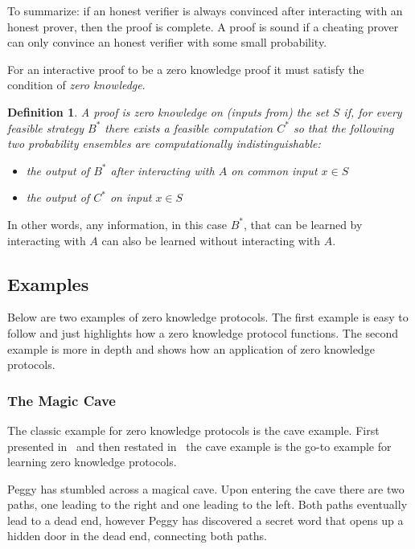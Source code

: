 \documentclass{sig-alternate}
\newtheorem{zeroKnowledge}{Definition}
\begin{document}
		To summarize: if an honest verifier is always convinced after interacting with
		an honest prover, then the proof is complete. A proof is sound if a cheating
		prover can only convince an honest verifier with some small probability.
		
		For an interactive proof to be a zero knowledge proof it must
		satisfy the condition of \textit{zero knowledge}.		
		
		\begin{zeroKnowledge}
			A proof is zero knowledge on (inputs from) the set $S$ if, for every feasible
			strategy $B^{*}$ there exists a feasible computation $C^{*}$ so that the
			following two probability ensembles are computationally indistinguishable:
			
			\begin{itemize}
				\item the output of $B^{*}$ after interacting with $A$ on common input
				$x \in S$
				
				\item the output of $C^{*}$ on input $x \in S$
			\end{itemize}						
			
		\end{zeroKnowledge}
		
		In other words, any information, in this case $B^{*}$, that can be learned by
		interacting with $A$ can also be learned without interacting with
		$A$.~\cite{Survey}

	\subsection{Examples}
	
	Below are two examples of zero knowledge protocols. The first
	example is easy to follow and just highlights how a zero knowledge
	protocol functions. The second example is more in depth and shows
	how an application of zero knowledge protocols.
	
	\subsubsection{The Magic Cave}
	The classic example for zero knowledge protocols is the cave example.
	First presented in~\cite{Children:1987} and then restated
	in~\cite{Survey} the cave example is the go-to example for learning
	zero knowledge protocols.

	Peggy has stumbled across a magical cave. Upon entering the cave
	there are two paths, one leading to the right and one leading to the
	left. Both paths eventually lead to a dead end, however Peggy has
	discovered a secret word that opens up a hidden door in the dead end,
	connecting both paths.
\end{document}
